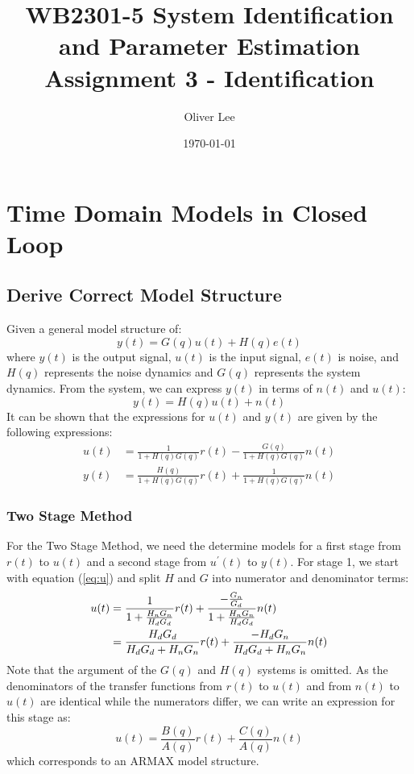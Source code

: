 \documentclass[11pt,a4paper]{article}
\title{WB2301-5 System Identification and Parameter Estimation \\
Assignment 3 - Identification}
\author{Oliver Lee}
\date{\today}
\begin{document}
\maketitle

\section{Time Domain Models in Closed Loop}

\subsection{Derive Correct Model Structure}
Given a general model structure of:
\begin{equation}
    y(t) = G(q)u(t) + H(q)e(t) \label{eq:gen_model}
\end{equation}
where $y(t)$ is the output signal, $u(t)$ is the input signal, $e(t)$ is noise,
and $H(q)$ represents the noise dynamics and $G(q)$ represents the system
dynamics. From the system, we can express $y(t)$ in terms of $n(t)$ and $u(t)$:
\begin{equation}
    y(t)= H(q)u(t) + n(t) \label{eq:y1}
\end{equation}
It can be shown that the expressions for $u(t)$ and $y(t)$ are
given by the following expressions:
\begin{align}
    u(t) &= \frac{1}{1 + H(q)G(q)}r(t) -
        \frac{G(q)}{1 + H(q)G(q)}n(t) \label{eq:u} \\
    y(t) &= \frac{H(q)}{1 + H(q)G(q)}r(t) +
        \frac{1}{1 + H(q)G(q)}n(t) \label{eq:y2}
\end{align}

\subsubsection{Two Stage Method}
\label{sec:1a1}
For the Two Stage Method, we need the determine models for a first stage from
$r(t)$ to $u(t)$ and a second stage from $u^\prime(t)$ to $y(t)$. For stage 1,
we start with equation (\ref{eq:u}) and split $H$ and $G$ into numerator and
denominator terms:
\begin{align}
    u(t) &= \frac{1}{1 + \frac{H_nG_n}{H_dG_d}}r(t) +
        \frac{-\frac{G_n}{G_d}}{1 + \frac{H_nG_n}{H_dG_d}}n(t) \notag \\
    &= \frac{H_dG_d}{H_dG_d + H_nG_n}r(t) +
        \frac{-H_dG_n}{H_dG_d + H_nG_n}n(t)  \label{eq:model11}
\end{align}
Note that the argument of the $G(q)$ and $H(q)$ systems is omitted. As the
denominators of the transfer functions from $r(t)$ to $u(t)$ and from $n(t)$ to
$u(t)$ are identical while the numerators differ, we can write an expression
for this stage as:
\begin{equation}
    u(t) = \frac{B(q)}{A(q)}r(t) + \frac{C(q)}{A(q)}n(t) \label{eq:armax}
\end{equation}
which corresponds to an ARMAX model structure.
\end{document}
